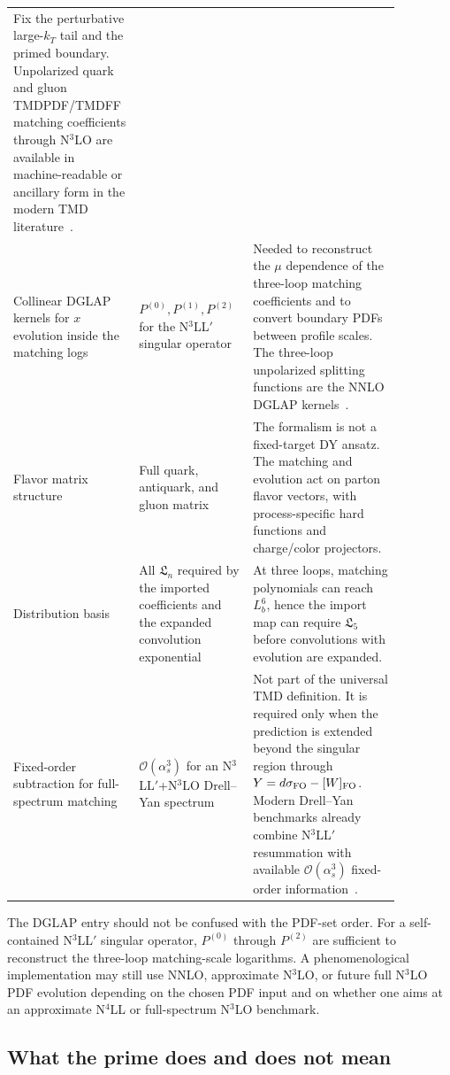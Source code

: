 \documentclass[11pt]{article}
\newcommand{\order}[1]{\mathcal{O}\!\left(#1\right)}
\begin{document}
\begin{longtable}{p{0.24\linewidth} p{0.27\linewidth} p{0.36\linewidth}}
Fix the perturbative large-$k_T$ tail and the primed boundary.  Unpolarized quark and gluon TMDPDF/TMDFF matching coefficients through N$^3$LO are available in machine-readable or ancillary form in the modern TMD literature~\cite{EbertMistlbergerVita2020,LuoYangZhuZhu2021}. \\
\addlinespace
Collinear DGLAP kernels for $x$ evolution inside the matching logs &
$P^{(0)},P^{(1)},P^{(2)}$ for the N$^3$LL$'$ singular operator &
Needed to reconstruct the $\mu$ dependence of the three-loop matching coefficients and to convert boundary PDFs between profile scales.  The three-loop unpolarized splitting functions are the NNLO DGLAP kernels~\cite{MochVermaserenVogt2004,VogtMochVermaseren2004}. \\
\addlinespace
Flavor matrix structure &
Full quark, antiquark, and gluon matrix &
The formalism is not a fixed-target DY ansatz.  The matching and evolution act on parton flavor vectors, with process-specific hard functions and charge/color projectors. \\
\addlinespace
Distribution basis &
All $\mathfrak L_n$ required by the imported coefficients and the expanded convolution exponential &
At three loops, matching polynomials can reach $L_b^6$, hence the import map can require $\mathfrak L_5$ before convolutions with evolution are expanded. \\
\addlinespace
Fixed-order subtraction for full-spectrum matching &
$\order{\alpha_s^3}$ for an N$^3$LL$'$+N$^3$LO Drell--Yan spectrum &
Not part of the universal TMD definition.  It is required only when the prediction is extended beyond the singular region through $Y=d\sigma_{\rm FO}-[W]_{\rm FO}$.  Modern Drell--Yan benchmarks already combine N$^3$LL$'$ resummation with available $\order{\alpha_s^3}$ fixed-order information~\cite{BillisMichelTackmann2025}. \\
\bottomrule
\end{longtable}

The DGLAP entry should not be confused with the PDF-set order.  For a self-contained
N$^3$LL$'$ singular operator, $P^{(0)}$ through $P^{(2)}$ are sufficient to reconstruct the
three-loop matching-scale logarithms.  A phenomenological implementation may still use
NNLO, approximate N$^3$LO, or future full N$^3$LO PDF evolution depending on the chosen
PDF input and on whether one aims at an approximate N$^4$LL or full-spectrum N$^3$LO
benchmark.

\subsection{What the prime does and does not mean}
\end{document}
